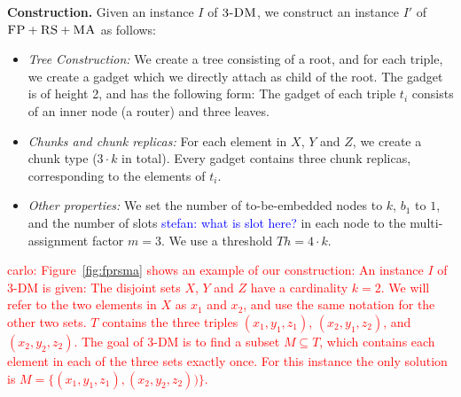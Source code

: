 \documentclass[9pt]{sigcomm-alternate}
\newcommand{\carlo}[1]{\textcolor{red}{carlo: #1}}
\newcommand{\maciek}[1]{\textcolor{brown}{maciek: #1}}
\newcommand{\stefan}[1]{\textcolor{blue}{stefan: #1}}
\newcommand{\MaFactor}{m}
\newcommand{\FP}{\textsc{FP}}
\newcommand{\RS}{\textsc{RS}}
\newcommand{\MA}{\textsc{MA}}
\newcommand{\CostTrans}{\ensuremath{b_1}}
\newcommand{\TDM}{\textsc{3-DM}}
\newcommand{\Thr}{\ensuremath{Th}}
\begin{document}
\textbf{Construction.}
Given an instance $I$ of $\TDM$, we construct an instance $I'$ of
$\FP+\RS+\MA$ as follows:
\begin{itemize}
\item \emph{Tree Construction:} We create a tree consisting of a root,
and for each triple, we create a gadget which we directly attach as
child of the root. The gadget is of height 2,
and has the following form:
The gadget of each triple $t_i$ consists of an inner node (a router) and three leaves.
\item \emph{Chunks and chunk replicas:} For each element in $X$, $Y$ and $Z$,
 we create a chunk type
($3 \cdot k$ in total). Every gadget
contains three chunk replicas, corresponding to the elements of $t_i$.
\item \emph{Other properties:} We set the number of to-be-embedded nodes to $k$,
$\CostTrans$ to $1$, and the number of slots \stefan{what is slot here?} in each node to the multi-assignment factor
$\MaFactor=3$.
We use a threshold $\Thr= 4
\cdot k$.
\end{itemize}

\carlo{Figure~\ref{fig:fprsma} shows an example of our construction: An
instance $I$ of 3-DM is given: The disjoint sets $X$, $Y$ and $Z$ have a
cardinality $k=2$. We will refer to the two elements in $X$ as $x_1$ and $x_2$,
and use the same notation for the other two sets. $T$ contains the three triples
$(x_1, y_1,
z_1)$, $(x_2, y_1, z_2)$, and $(x_2, y_2, z_2)$. The goal of 3-DM is to find a
subset $M \subseteq T$, which contains each element in each of the three sets
exactly once. For this instance the only solution is $M =
\{(x_1,y_1,z_1),(x_2,y_2,z_2))\}$.}
\end{document}
